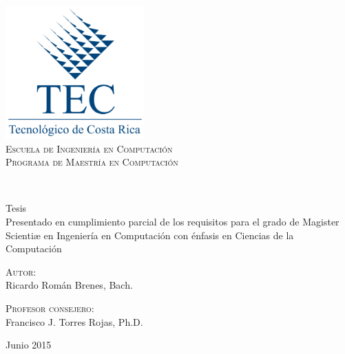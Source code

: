 \begin{titlepage}

\begin{center}

\includegraphics[width=0.4\textwidth]{images/logotec.png}
\\[0.2cm]
\textcolor{tecblue}{%
\textsc{\LARGE Escuela de Ingeniería en Computación}\\[0.2cm]
\textsc{\large Programa de Maestría en Computación}\\}
 \vfill
 
\doublespacing
{ \huge \bfseries \thesistitle}
\\[1.0cm]
\singlespacing

{\Large Tesis\\

Presentado en cumplimiento parcial de los requisitos para el grado de Magister Scientiæ en Ingeniería en Computación con énfasis en Ciencias de la Computación}
\\
\vfill
 
\begin{minipage}{0.45\textwidth}
\begin{flushleft} \large
\textsc{Autor:}\\
{Ricardo Román Brenes, Bach.}
\end{flushleft}
\end{minipage}
\begin{minipage}{0.50\textwidth}
\begin{flushright} \large
\textsc{Profesor consejero:}\\
{Francisco J. Torres Rojas, Ph.D.}
\end{flushright}
\end{minipage}
 
 
\vfill
 
{\large Junio 2015}
\end{center}
\end{titlepage}